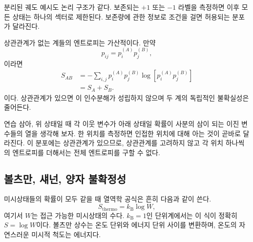 분리된 궤도 예시도 논리 구조가 같다. 보존되는 \(+1\) 또는 \(-1\) 라벨을 측정하면 이후 모든 상태는 하나의 섹터로 제한된다. 보존량에 관한 정보로 조건을 걸면 허용되는 분포가 달라진다.

상관관계가 없는 계들의 엔트로피는 가산적이다. 만약
\begin{equation}
 p_{ij}=p_i^{(A)}p_j^{(B)},
\end{equation}
이라면
\begin{align}
 S_{AB}
 &=-\sum_{i,j}p_i^{(A)}p_j^{(B)}
 \log\!\left[p_i^{(A)}p_j^{(B)}\right]\\
 &=S_A+S_B.
 \label{eq:sm1-entropy-additivity}
\end{align}
이다. 상관관계가 있으면 이 인수분해가 성립하지 않으며 두 계의 독립적인 불확실성은 줄어든다.

연습 삼아, 위 상태일 때 각 이웃 변수가 아래 상태일 확률이 사분의 삼이 되는 이진 변수들의 열을 생각해 보자. 한 위치를 측정하면 인접한 위치에 대해 아는 것이 곧바로 달라진다. 이 분포에는 상관관계가 있으므로, 상관관계를 고려하지 않고 각 위치 하나씩의 엔트로피를 더해서는 전체 엔트로피를 구할 수 없다.

\subsection{볼츠만, 섀넌, 양자 불확정성}

\begin{classroomqa}
\end{classroomqa}

미시상태들의 확률이 모두 같을 때 열역학 공식은 흔히 다음과 같이 쓴다.
\begin{equation}
 S_{\mathrm{thermo}}=k_{\mathrm B}\log W,
 \label{eq:sm1-boltzmann-formula}
\end{equation}
여기서 \(W\)는 접근 가능한 미시상태의 수다. \(k_{\mathrm B}=1\)인 단위계에서는 이 식이 정확히 \(S=\log W\)이다. 볼츠만 상수는 온도 단위와 에너지 단위 사이를 변환하며, 온도의 자연스러운 미시적 척도는 에너지다.

\begin{classroomqa}
\end{classroomqa}

